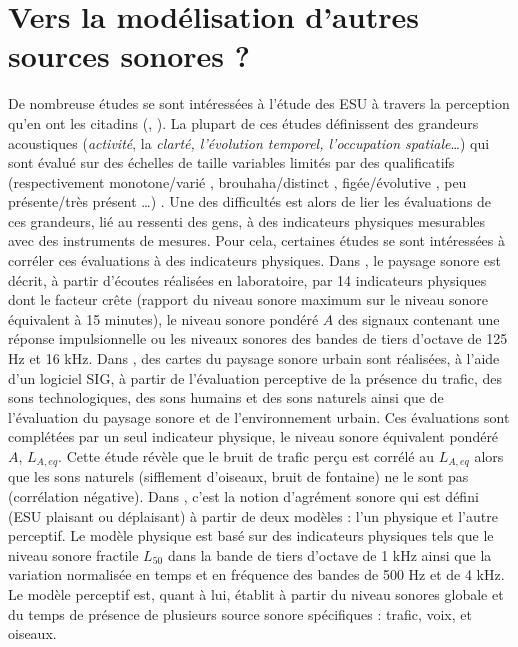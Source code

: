\section{Vers la modélisation d'autres sources sonores ?}

De nombreuse études se sont intéressées à l'étude des ESU à travers la perception qu'en ont les citadins (\cite{brocolini_measurements_2013},  \cite{hong2013designing}). La plupart de ces études définissent des grandeurs acoustiques (\textit{activité}, la \textit{clarté, l'évolution temporel, l'occupation spatiale}\dots) qui sont évalué sur des échelles de taille variables limités par des qualificatifs (respectivement \og monotone/varié \fg{}, \og brouhaha/distinct \fg{}, \og figée/évolutive \fg{}, \og peu présente/très présent \fg{} \dots) \cite{raimbault2003ambient}.
Une des difficultés est alors de lier les évaluations de ces grandeurs, lié au ressenti des gens, à des indicateurs physiques mesurables avec des instruments de mesures. 
Pour cela, certaines études se sont intéressées à corréler ces évaluations à des indicateurs physiques.
Dans \cite{torija2013application}, le paysage sonore est décrit, à partir d'écoutes réalisées en laboratoire, par 14 indicateurs physiques dont le facteur crête (rapport du niveau sonore maximum sur le niveau sonore équivalent à 15 minutes), le niveau sonore pondéré $A$ des signaux contenant une réponse impulsionnelle ou les niveaux sonores des bandes de tiers d'octave de 125 Hz et 16 kHz. 
Dans \cite{hong2014soundscape}, des cartes du paysage sonore urbain sont réalisées, à l'aide d'un logiciel SIG, à partir de l'évaluation perceptive de la présence du trafic, des sons technologiques, des sons humains et des sons naturels ainsi que de l'évaluation du paysage sonore et de l'environnement urbain. Ces évaluations sont complétées par un seul indicateur physique, le niveau sonore équivalent pondéré $A$, $L_{A,eq}$. Cette étude révèle que le bruit de trafic perçu est corrélé au $L_{A,eq}$ alors que les sons naturels (sifflement d'oiseaux, bruit de fontaine) ne le sont pas (corrélation négative). Dans \cite{aumond2017modeling}, c'est la notion d'agrément sonore qui est défini (ESU plaisant ou déplaisant) à partir de deux modèles : l'un physique et l'autre perceptif. Le modèle physique est basé sur des indicateurs physiques tels que le niveau sonore fractile $L_{50}$ dans la bande de tiers d'octave de 1 kHz ainsi que la variation normalisée en temps et en fréquence des bandes de 500 Hz et de 4 kHz. Le modèle perceptif est, quant à lui, établit à partir du niveau sonores globale et du temps de présence de plusieurs source sonore spécifiques : trafic, voix, et oiseaux. 
